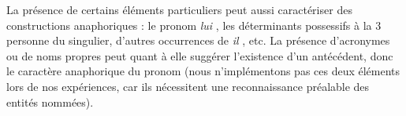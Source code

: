 \documentclass[a4paper,12pt]{article}
\begin{document}
La présence de certains éléments particuliers peut aussi caractériser des constructions anaphoriques : le pronom \og \textit{lui} \fg{}, les déterminants possessifs à la 3 personne du singulier, d'autres occurrences de \og \textit{il} \fg{}, etc. La présence d'acronymes ou de noms propres peut quant à elle suggérer l'existence d'un antécédent, donc le caractère anaphorique du pronom (nous n'implémentons pas ces deux éléments lors de nos expériences, car ils nécessitent une reconnaissance préalable des entités nommées).

%
%
%
\end{document}
